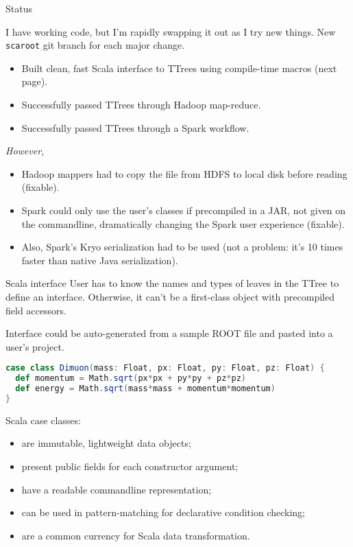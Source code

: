 \documentclass{beamer}
\begin{document}
\begin{frame}{Status}

\begin{block}{}
\vspace{-\baselineskip}
I have working code, but I'm rapidly swapping it out as I try new things. New {\tt scaroot} git branch for each major change.
\end{block}

\begin{itemize}
\item Built clean, fast Scala interface to TTrees using compile-time macros (next page).
\item Successfully passed TTrees through Hadoop map-reduce.
\item Successfully passed TTrees through a Spark workflow.
\end{itemize}

{\it However,}
\begin{itemize}
\item Hadoop mappers had to copy the file from HDFS to local disk before reading (fixable).
\item Spark could only use the user's classes if precompiled in a JAR, not given on the commandline, dramatically changing the Spark user experience (fixable).
\item Also, Spark's Kryo serialization had to be used (not a problem: it's 10 times faster than native Java serialization).
\end{itemize}
\end{frame}

\begin{frame}[fragile]{Scala interface}
User has to know the names and types of leaves in the TTree to define an interface. Otherwise, it can't be a first-class object with precompiled field accessors.

\vspace{0.5\baselineskip}
Interface could be auto-generated from a sample ROOT file and pasted into a user's project.

\begin{minipage}{1.1\linewidth}
\begin{lstlisting}[language=scala]
case class Dimuon(mass: Float, px: Float, py: Float, pz: Float) {
  def momentum = Math.sqrt(px*px + py*py + pz*pz)
  def energy = Math.sqrt(mass*mass + momentum*momentum)
}
\end{lstlisting}
\end{minipage}

Scala case classes:
\begin{itemize}
\item are immutable, lightweight data objects;
\item present public fields for each constructor argument;
\item have a readable commandline representation;
\item can be used in pattern-matching for declarative condition checking;
\item are a common currency for Scala data transformation.
\end{itemize}
\end{frame}
\end{document}
